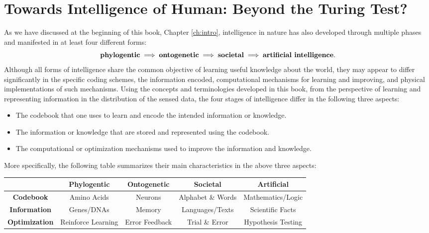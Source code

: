 \documentclass[../../book-main.tex]{subfiles}
\begin{document}
\section{Towards Intelligence of Human: Beyond the Turing Test?}
As we have discussed at the beginning of this book, Chapter \ref{ch:intro}, intelligence in nature has also developed through multiple phases and manifested in at least four different forms:
\begin{equation}
\mbox{\textbf{phylogentic}} \;
   \Longrightarrow \; \mbox{\textbf{ontogenetic}} \; \Longrightarrow \; 
   \mbox{\textbf{societal}}
   \; \Longrightarrow \; 
   \mbox{\textbf{artificial intelligence}}.
\end{equation}
Although all forms of intelligence share the common objective of learning useful knowledge about the world, they may appear to differ significantly in the specific coding schemes, the information encoded, computational mechanisms for learning and improving, and physical implementations of such mechanisms. Using the concepts and terminologies developed in this book, from the perspective of learning and representing information in the distribution of the sensed data, the four stages of intelligence differ in the following three aspects:
\begin{itemize}
    \item The codebook that one uses to learn and encode the intended information or knowledge.
    \item The information or knowledge that are stored and  represented using the codebook. 
    \item The computational or optimization mechanisms used to improve the information and knowledge.
\end{itemize}
More specifically, the following table summarizes their main characteristics in the above three aspects:
\begin{center}
\begin{tabular}{| c | c | c | c | c |}
\hline & \textbf{Phylogentic} & \textbf{Ontogenetic} & \textbf{Societal} & \textbf{Artificial}\\
\hline
\textbf{Codebook}  & Amino Acids & Neurons & Alphabet \& Words & Mathematics/Logic \\ [0.5ex]
  \hline 
\textbf{Information} & Genes/DNAs & Memory & Languages/Texts & Scientific Facts\\ [0.5ex]
  \hline
\textbf{Optimization} & Reinforce Learning & Error Feedback & Trial \& Error & Hypothesis Testing \\  [0.5ex]
\hline
\end{tabular}
\end{center}
\end{document}
